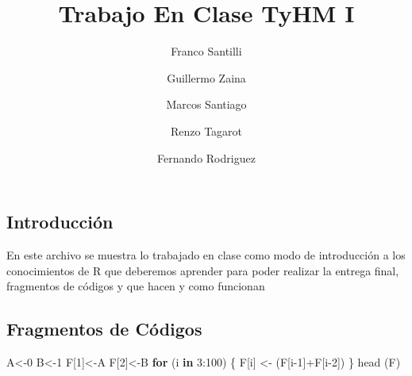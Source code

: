 \documentclass[]{elsarticle} %
\newenvironment{Shaded}{\begin{snugshade}}{\end{snugshade}}
\newcommand{\ControlFlowTok}[1]{\textcolor[rgb]{0.13,0.29,0.53}{\textbf{#1}}}
\newcommand{\DecValTok}[1]{\textcolor[rgb]{0.00,0.00,0.81}{#1}}
\newcommand{\FunctionTok}[1]{\textcolor[rgb]{0.00,0.00,0.00}{#1}}
\newcommand{\NormalTok}[1]{#1}
\newcommand{\OtherTok}[1]{\textcolor[rgb]{0.56,0.35,0.01}{#1}}
\newcommand{\SpecialCharTok}[1]{\textcolor[rgb]{0.00,0.00,0.00}{#1}}
\begin{document}
\begin{frontmatter}

  \title{Trabajo En Clase TyHM I}
    \author[Facultad de Ingeniería]{Franco Santilli%
  }
    \author[Facultad de Ingeniería]{Guillermo Zaina}
    \author[Facultad de Ingeniería]{Marcos Santiago%
  }
    \author[Facultad de Ingeniería]{Renzo Tagarot%
  }
    \author[Facultad de Ingeniería]{Fernando Rodriguez%
  }
  
  \begin{abstract}
  
  \end{abstract}
  
 \end{frontmatter}

\hypertarget{introducciuxf3n}{%
\subsection{Introducción}\label{introducciuxf3n}}

En este archivo se muestra lo trabajado en clase como modo de
introducción a los conocimientos de R que deberemos aprender para poder
realizar la entrega final, fragmentos de códigos y que hacen y como
funcionan

\hypertarget{fragmentos-de-cuxf3digos}{%
\subsection{Fragmentos de Códigos}\label{fragmentos-de-cuxf3digos}}

\begin{Shaded}
\begin{Highlighting}[]
\NormalTok{A}\OtherTok{\textless{}{-}}\DecValTok{0}
\NormalTok{B}\OtherTok{\textless{}{-}}\DecValTok{1}
\NormalTok{F[}\DecValTok{1}\NormalTok{]}\OtherTok{\textless{}{-}}\NormalTok{A}
\NormalTok{F[}\DecValTok{2}\NormalTok{]}\OtherTok{\textless{}{-}}\NormalTok{B}
\ControlFlowTok{for}\NormalTok{ (i }\ControlFlowTok{in} \DecValTok{3}\SpecialCharTok{:}\DecValTok{100}\NormalTok{) \{ F[i] }\OtherTok{\textless{}{-}}\NormalTok{ (F[i}\DecValTok{{-}1}\NormalTok{]}\SpecialCharTok{+}\NormalTok{F[i}\DecValTok{{-}2}\NormalTok{]) \}}
\FunctionTok{head}\NormalTok{ (F)}
\end{Highlighting}
\end{Shaded}
\end{document}
